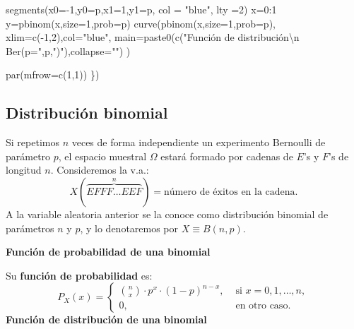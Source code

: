 \documentclass[
  letterpaper,
  DIV=11,
  numbers=noendperiod]{scrreprt}
\newenvironment{Shaded}{\begin{snugshade}}{\end{snugshade}}
\newcommand{\AttributeTok}[1]{\textcolor[rgb]{0.40,0.45,0.13}{#1}}
\newcommand{\DecValTok}[1]{\textcolor[rgb]{0.68,0.00,0.00}{#1}}
\newcommand{\FunctionTok}[1]{\textcolor[rgb]{0.28,0.35,0.67}{#1}}
\newcommand{\NormalTok}[1]{\textcolor[rgb]{0.00,0.23,0.31}{#1}}
\newcommand{\OtherTok}[1]{\textcolor[rgb]{0.00,0.23,0.31}{#1}}
\newcommand{\SpecialCharTok}[1]{\textcolor[rgb]{0.37,0.37,0.37}{#1}}
\newcommand{\StringTok}[1]{\textcolor[rgb]{0.13,0.47,0.30}{#1}}
\begin{document}
\begin{Shaded}
\begin{Highlighting}[]
\FunctionTok{segments}\NormalTok{(}\AttributeTok{x0=}\SpecialCharTok{{-}}\DecValTok{1}\NormalTok{,}\AttributeTok{y0=}\NormalTok{p,}\AttributeTok{x1=}\DecValTok{1}\NormalTok{,}\AttributeTok{y1=}\NormalTok{p, }\AttributeTok{col =} \StringTok{"blue"}\NormalTok{, }\AttributeTok{lty =}\DecValTok{2}\NormalTok{)}
\NormalTok{x}\OtherTok{=}\DecValTok{0}\SpecialCharTok{:}\DecValTok{1}
\NormalTok{y}\OtherTok{=}\FunctionTok{pbinom}\NormalTok{(x,}\AttributeTok{size=}\DecValTok{1}\NormalTok{,}\AttributeTok{prob=}\NormalTok{p)}
\FunctionTok{curve}\NormalTok{(}\FunctionTok{pbinom}\NormalTok{(x,}\AttributeTok{size=}\DecValTok{1}\NormalTok{,}\AttributeTok{prob=}\NormalTok{p),}
      \AttributeTok{xlim=}\FunctionTok{c}\NormalTok{(}\SpecialCharTok{{-}}\DecValTok{1}\NormalTok{,}\DecValTok{2}\NormalTok{),}\AttributeTok{col=}\StringTok{"blue"}\NormalTok{,}
      \AttributeTok{main=}\FunctionTok{paste0}\NormalTok{(}\FunctionTok{c}\NormalTok{(}\StringTok{"Función de distribución}\SpecialCharTok{\textbackslash{}n}\StringTok{ Ber(p="}\NormalTok{,p,}\StringTok{")"}\NormalTok{),}\AttributeTok{collapse=}\StringTok{""}\NormalTok{)}
\NormalTok{      )}

\FunctionTok{par}\NormalTok{(}\AttributeTok{mfrow=}\FunctionTok{c}\NormalTok{(}\DecValTok{1}\NormalTok{,}\DecValTok{1}\NormalTok{))}
\NormalTok{\})}
\end{Highlighting}
\end{Shaded}

\hypertarget{distribuciuxf3n-binomial}{%
\subsection{Distribución binomial}\label{distribuciuxf3n-binomial}}

Si repetimos \(n\) veces de forma independiente un experimento Bernoulli
de parámetro \(p\), el espacio muestral \(\Omega\) estará formado por
cadenas de \(E\)'s y \(F\)'s de longitud \(n\). Consideremos la v.a.:
\[X(\overbrace{EFFF\ldots EEF}^{n})=\mbox{número de éxitos en la cadena}.\]
A la variable aleatoria anterior se la conoce como distribución binomial
de parámetros \(n\) y \(p\), y lo denotaremos por \(X\equiv B(n,p).\)

\textbf{Función de probabilidad de una binomial}

Su \textbf{función de probabilidad} es: \[
P_{X}(x)=\left\{
\begin{array}{ll}
{n\choose x}\cdot  p^x \cdot(1-p)^{n-x}, &\mbox{ si } x=0,1,\ldots,n,\\
0,  & \mbox{ en otro caso.}
\end{array}\right.
\] \textbf{Función de distribución de una binomial}
\end{document}
